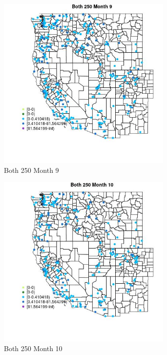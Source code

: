 \begin{figure} 
\centering  
\includegraphics[width=0.77\textwidth]{Code_Outputs/Report_ML_input_PM25_Step4_part_e_de_duplicated_aveswNAs_MapObsMo9Both_250.jpg} 
\caption{\label{fig:Report_ML_input_PM25_Step4_part_e_de_duplicated_aveswNAsMapObsMo9Both_250}Both 250 Month 9} 
\end{figure} 
 

\begin{figure} 
\centering  
\includegraphics[width=0.77\textwidth]{Code_Outputs/Report_ML_input_PM25_Step4_part_e_de_duplicated_aveswNAs_MapObsMo10Both_250.jpg} 
\caption{\label{fig:Report_ML_input_PM25_Step4_part_e_de_duplicated_aveswNAsMapObsMo10Both_250}Both 250 Month 10} 
\end{figure} 
 

